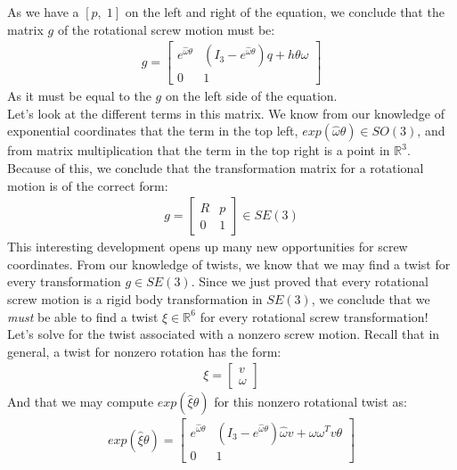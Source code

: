 \documentclass[oneside]{book}
\begin{document}
As we have a $[p, \; 1]$ on the left and right of the equation, we conclude that the matrix $g$ of the rotational screw motion must be:
\begin{align}
    g = 
    \begin{bmatrix}
    e^{\hat\omega\theta} & (I_3 -e^{\hat\omega\theta})q + h\theta\omega \\
    0 & 1
    \end{bmatrix}
\end{align}
As it must be equal to the $g$ on the left side of the equation.\\
Let's look at the different terms in this matrix. We know from our knowledge of exponential coordinates that the term in the top left, $exp(\hat\omega\theta) \in SO(3)$, and from matrix multiplication that the term in the top right is a point in $\mathbb{R}^3$. \\
Because of this, we conclude that the transformation matrix for a rotational motion is of the correct form:
\begin{align}
    g = \begin{bmatrix}
    R & p \\
    0 & 1
    \end{bmatrix} \in SE(3)
\end{align}
This interesting development opens up many new opportunities for screw coordinates. From our knowledge of twists, we know that we may find a twist for every transformation $g \in SE(3)$. Since we just proved that every rotational screw motion is a rigid body transformation in $SE(3)$, we conclude that we \textit{must} be able to find a twist $\xi \in \mathbb{R}^6$ for every rotational screw transformation!\\
Let's solve for the twist associated with a nonzero screw motion. Recall that in general, a twist for nonzero rotation has the form:
\begin{align}
    \xi = 
    \begin{bmatrix}
    v\\
    \omega
    \end{bmatrix}
\end{align}
And that we may compute $exp(\hat\xi\theta)$ for this nonzero rotational twist as:
\begin{align}
    exp(\hat\xi\theta) = 
    \begin{bmatrix}
    e^{\hat\omega\theta} & (I_3 - e^{\hat\omega\theta})\hat\omega v + \omega \omega ^T v\theta\\
    0 & 1
    \end{bmatrix}
\end{align}
\end{document}
